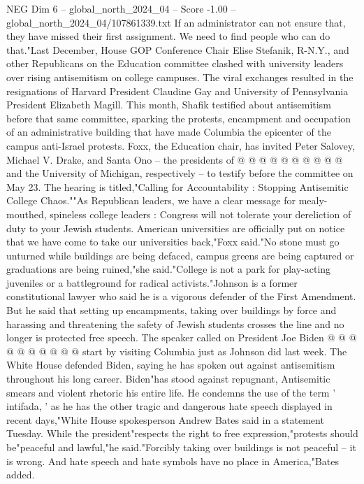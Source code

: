 \begin{textsample}{NEG Dim 6 – global\_north\_2024\_04 – Score -1.00 – global\_north\_2024\_04/107861339.txt}
If an administrator can not ensure that, they have missed their first assignment.
We need to find people who can do that."Last December, House GOP Conference Chair Elise Stefanik, R-N.Y., and other Republicans on the Education committee clashed with university leaders over rising antisemitism on college campuses.
The viral exchanges resulted in the resignations of Harvard President Claudine Gay and University of Pennsylvania President Elizabeth Magill.
This month, Shafik testified about antisemitism before that same committee, sparking the protests, encampment and occupation of an administrative building that have made Columbia the epicenter of the campus anti-Israel protests.
Foxx, the Education chair, has invited Peter Salovey, Michael V.
Drake, and Santa Ono -- the presidents of @ @ @ @ @ @ @ @ @ @ and the University of Michigan, respectively -- to testify before the committee on May 23.
The hearing is titled,"Calling for Accountability : Stopping Antisemitic College Chaos.""As Republican leaders, we have a clear message for mealy-mouthed, spineless college leaders : Congress will not tolerate your dereliction of duty to your Jewish students.
American universities are officially put on notice that we have come to take our universities back,"Foxx said."No stone must go unturned while buildings are being defaced, campus greens are being captured or graduations are being ruined,"she said."College is not a park for play-acting juveniles or a battleground for radical activists."Johnson is a former constitutional lawyer who said he is a vigorous defender of the First Amendment.
But he said that setting up encampments, taking over buildings by force and harassing and threatening the safety of Jewish students crosses the line and no longer is protected free speech.
The speaker called on President Joe Biden @ @ @ @ @ @ @ @ @ @ start by visiting Columbia just as Johnson did last week.
The White House defended Biden, saying he has spoken out against antisemitism throughout his long career.
Biden"has stood against repugnant, Antisemitic smears and violent rhetoric his entire life.
He condemns the use of the term ' intifada, ' as he has the other tragic and dangerous hate speech displayed in recent days,"White House spokesperson Andrew Bates said in a statement Tuesday.
While the president"respects the right to free expression,"protests should be"peaceful and lawful,"he said."Forcibly taking over buildings is not peaceful -- it is wrong.
And hate speech and hate symbols have no place in America,"Bates added.

\end{textsample}
